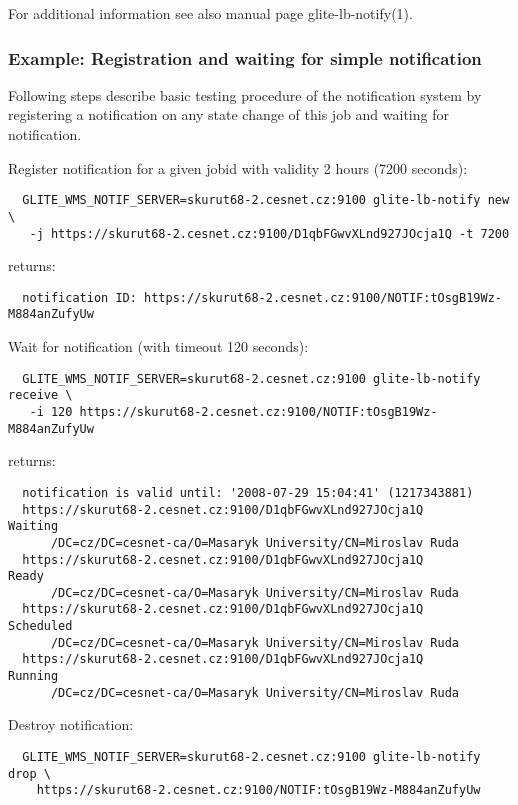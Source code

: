 For additional information see also manual page glite-lb-notify(1).

\subsubsection{Example: Registration and waiting for simple notification}
\label{e:notify}

Following steps describe basic testing procedure of the notification
system by registering a notification on any state change of this job
and waiting for notification.

Register notification for a given jobid
with validity 2 hours (7200 seconds):

\begin{verbatim}
  GLITE_WMS_NOTIF_SERVER=skurut68-2.cesnet.cz:9100 glite-lb-notify new \
   -j https://skurut68-2.cesnet.cz:9100/D1qbFGwvXLnd927JOcja1Q -t 7200
\end{verbatim}

returns:

\begin{verbatim}
  notification ID: https://skurut68-2.cesnet.cz:9100/NOTIF:tOsgB19Wz-M884anZufyUw 
\end{verbatim}


Wait for notification (with timeout 120 seconds):
\begin{verbatim}
  GLITE_WMS_NOTIF_SERVER=skurut68-2.cesnet.cz:9100 glite-lb-notify receive \
   -i 120 https://skurut68-2.cesnet.cz:9100/NOTIF:tOsgB19Wz-M884anZufyUw 
\end{verbatim}

returns:
\begin{verbatim}
  notification is valid until: '2008-07-29 15:04:41' (1217343881)
  https://skurut68-2.cesnet.cz:9100/D1qbFGwvXLnd927JOcja1Q        Waiting
      /DC=cz/DC=cesnet-ca/O=Masaryk University/CN=Miroslav Ruda
  https://skurut68-2.cesnet.cz:9100/D1qbFGwvXLnd927JOcja1Q        Ready
      /DC=cz/DC=cesnet-ca/O=Masaryk University/CN=Miroslav Ruda
  https://skurut68-2.cesnet.cz:9100/D1qbFGwvXLnd927JOcja1Q        Scheduled
      /DC=cz/DC=cesnet-ca/O=Masaryk University/CN=Miroslav Ruda
  https://skurut68-2.cesnet.cz:9100/D1qbFGwvXLnd927JOcja1Q        Running
      /DC=cz/DC=cesnet-ca/O=Masaryk University/CN=Miroslav Ruda
\end{verbatim}

Destroy notification:
\begin{verbatim}
  GLITE_WMS_NOTIF_SERVER=skurut68-2.cesnet.cz:9100 glite-lb-notify drop \
    https://skurut68-2.cesnet.cz:9100/NOTIF:tOsgB19Wz-M884anZufyUw
\end{verbatim}


